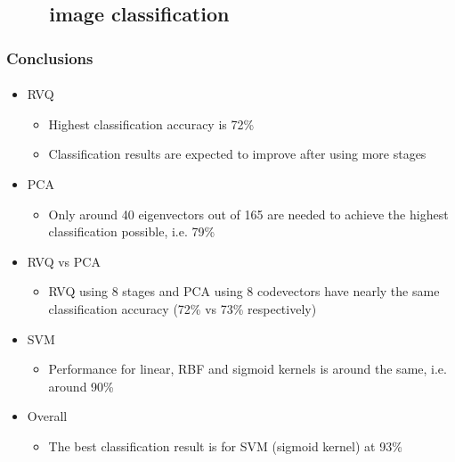 \subsection{\ \ \ \ image classification}
\begin{frame}
\frametitle{Conclusions}
\framesubtitle{}
\logoCSIPCPL\mypagenum
	\begin{itemize}
		\item {\color{red}RVQ}
			\begin{itemize}
				\item Highest classification accuracy is 72\%
				\item Classification results are expected to improve after using more stages
			\end{itemize}
		\item {\color{red}PCA}
			\begin{itemize}
				\item Only around 40 eigenvectors out of 165 are needed to achieve the highest classification possible, i.e. 79\%
			\end{itemize}
		\item {\color{red}RVQ vs PCA}
			\begin{itemize}
				\item RVQ using 8 stages and PCA using 8 codevectors have nearly the same classification accuracy (72\% vs 73\% respectively)
			\end{itemize}
		\item {\color{red}SVM} 
				\begin{itemize}
					\item Performance for linear, RBF and sigmoid kernels is around the same, i.e. around 90\%	
				\end{itemize}
		\item {\color{red}Overall} 
			\begin{itemize}
				\item The best classification result is for SVM (sigmoid kernel) at 93\%	
			\end{itemize}
	\end{itemize}
\end{frame}


